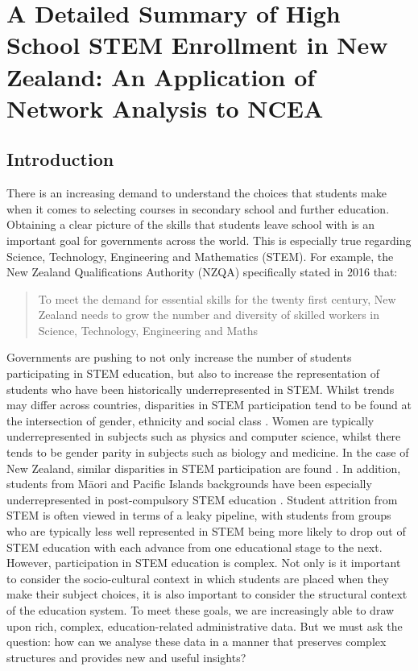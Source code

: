 \chapter[Summary of High School STEM Enrollment in New Zealand]{A Detailed Summary of High School STEM Enrollment in New Zealand: An Application of Network Analysis to NCEA}

\section{Introduction}
There is an increasing demand to understand the choices that students make when it comes to selecting courses in secondary school and further education. Obtaining a clear picture of the skills that students leave school with is an important goal for governments across the world. This is especially true regarding Science, Technology, Engineering and Mathematics (STEM). For example, the New Zealand Qualifications Authority (NZQA) \citep[p.8]{NZQA2016} specifically stated in 2016 that:

\begin{quote}
    To meet the demand for essential skills for the twenty first century, New Zealand needs to grow the number and diversity of skilled workers in Science, Technology, Engineering and Maths
\end{quote}  

Governments are pushing to not only increase the number of students participating in STEM education, but also to increase the representation of students who have been historically underrepresented in STEM. Whilst trends may differ across countries, disparities in STEM participation tend to be found at the intersection of gender, ethnicity and social class \citep{Archer2015b, PISA_NZ_2017}. Women are typically underrepresented in subjects such as physics and computer science, whilst there tends to be gender parity in subjects such as biology and medicine. In the case of New Zealand, similar disparities in STEM participation are found \citep{NZQA2016,EducationCounts_2016a,EducationCounts_2016b}. In addition, students from M\={a}ori and Pacific Islands backgrounds have been especially underrepresented in post-compulsory STEM education \citep{MoH2014, NZQA2016}. Student attrition from STEM is often viewed in terms of a leaky pipeline, with students from groups who are typically less well represented in STEM being more likely to drop out of STEM education with each advance from one educational stage to the next. However, participation in STEM education is  complex. Not only is it important to consider the socio-cultural context in which students are placed when they make their subject choices, it is also important to consider the structural context of the education system. To meet these goals, we are increasingly able to draw upon rich, complex, education-related administrative data. But we must ask the question: how can we analyse these data in a manner that preserves complex structures and provides new and useful insights?

